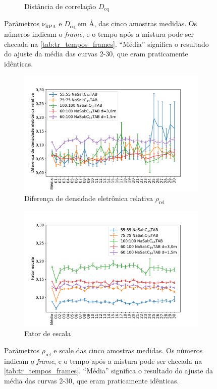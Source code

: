 \begin{figure}
\begin{subfigure}[t]{0.5\textwidth}
			\caption{Distância de correlação \(D_{\mathrm{cq}}\)}
			\label{fig:param_dcq}
		\end{subfigure}
		\caption{Parâmetros \(\nu_{\mathrm{RPA}}\) e \(D_{\mathrm{cq}}\) em \AA, das cinco amostras medidas. Os números indicam o \emph{frame}, e o tempo após a mistura pode ser checada na \autoref{tab:tr_tempos_frames}. ``Média'' significa o resultado do ajuste da média das curvas 2-30, que eram praticamente idênticas.}
		\label{fig:params_nurpa_dcq}
	\end{figure}

	\begin{figure}
		\begin{subfigure}[t]{0.5\textwidth}
			\centering
			\includegraphics[width=\textwidth]{imagens/saxs/param_rho_rel}
			\caption{Diferença de densidade eletrônica relativa \(\rho_{\mathrm{rel}}\)}
			\label{fig:param_rhorel}
		\end{subfigure} %
		\begin{subfigure}[t]{0.5\textwidth}
			\centering
			\includegraphics[width=\textwidth]{imagens/saxs/param_scale}
			\caption{Fator de escala}
			\label{fig:param_scale}
		\end{subfigure}
		\caption{Parâmetros \(\rho_{\mathrm{rel}}\) e \(\mathrm{scale}\) das cinco amostras medidas. Os números indicam o \emph{frame}, e o tempo após a mistura pode ser checada na \autoref{tab:tr_tempos_frames}. ``Média'' significa o resultado do ajuste da média das curvas 2-30, que eram praticamente idênticas.}
		\label{fig:params_scale_rhorel}
	\end{figure}

